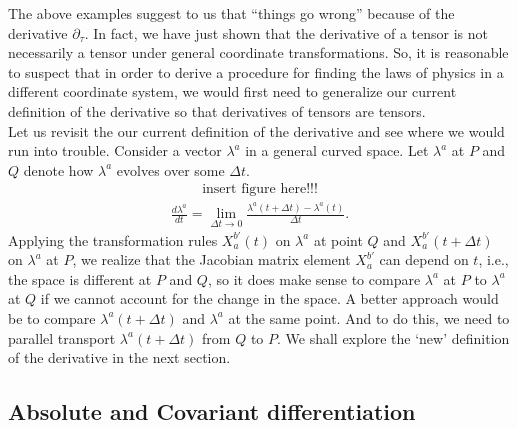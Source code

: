 \documentclass{article}
\theoremstyle{definition}
\begin{document}
The above examples suggest to us that ``things go wrong'' because of the derivative $\partial_\tau$. In fact, we have just shown that the derivative of a tensor is not necessarily a tensor under general coordinate transformations. So, it is reasonable to suspect that in order to derive a procedure for finding the laws of physics in a different coordinate system, we would first need to generalize our current definition of the derivative so that derivatives of tensors are tensors.\\

Let us revisit the our current definition of the derivative and see where we would run into trouble. Consider a vector $\lambda^a$ in a general curved space. Let $\lambda^a$ at $P$ and $Q$ denote how $\lambda^a$ evolves over some $\Delta t$.
\begin{align*}
\text{insert figure here!!!}
\end{align*}
\begin{align*}
\frac{d\lambda^a}{dt} = \lim_{\Delta t \rightarrow 0}\frac{\lambda^a(t+\Delta t) - \lambda^a(t)}{\Delta t}.
\end{align*}
Applying the transformation rules $X^{b'}_a(t)$ on $\lambda^a$ at point $Q$ and $X^{b'}_a(t+\Delta t)$ on $\lambda^a$ at $P$, we realize that the Jacobian matrix element $X^{b'}_a$ can depend on $t$, i.e., the space is different at $P$ and $Q$, so it does make sense to compare $\lambda^a$ at $P$ to $\lambda^a$ at $Q$ if we cannot account for the change in the space. A better approach would be to compare $\lambda^a(t+\Delta t)$ and $\lambda^a$ at the same point. And to do this, we need to parallel transport $\lambda^a(t+\Delta t)$ from $Q$ to $P$. We shall explore the `new' definition of the derivative in the next section.


\subsection{Absolute and Covariant differentiation}
\end{document}
